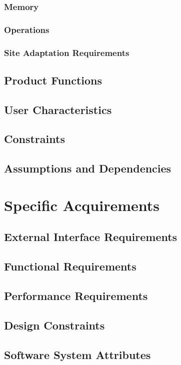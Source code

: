 \documentclass[a4paper,10pt]{article}
\begin{document}
		\subsubsection{Memory}
		\subsubsection{Operations}
		\subsubsection{Site Adaptation Requirements}
		
	\subsection{Product Functions}
	\subsection{User Characteristics}
	\subsection{Constraints}
	\subsection{Assumptions and Dependencies}

\section{Specific Acquirements}

	\subsection{External Interface Requirements}
	\subsection{Functional Requirements}
	\subsection{Performance Requirements}
	\subsection{Design Constraints}
	\subsection{Software System Attributes}
\end{document}
